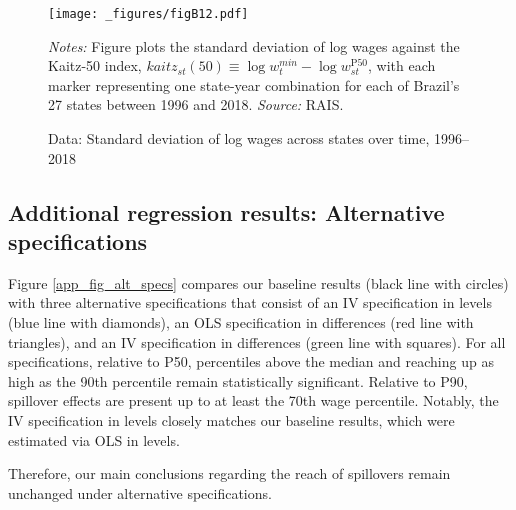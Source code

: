 \begin{figure}[!htb]
  \centering
  \caption{\label{fig:Lee_state_sd}Data: Standard deviation of log wages across states over time, 1996--2018}
  \prefigvspace
  \texttt{[image: \_figures/figB12.pdf]} %
  \\
  \postfigvspace
  \begin{minipage}[t]{1\columnwidth}%
    \begin{spacing}{0.75}
      \emph{\scriptsize{}Notes:}{\scriptsize{} Figure plots the standard deviation of log wages against the Kaitz-50 index, $kaitz_{st}(50)\equiv\log w_{t}^{min}-\log w_{st}^{\text{P}50}$,
      with each marker representing one state-year combination for each
      of Brazil's 27 states between 1996 and 2018. %
      \emph{\scriptsize{}Source: } RAIS.}
    \end{spacing}
  \end{minipage}
\end{figure}






\clearpage
\subsection{Additional regression results: Alternative specifications\label{app_subsec_alt_specs}}

Figure \ref{app_fig_alt_specs} compares our baseline results (black line with circles) with three alternative specifications that consist of an IV specification in levels (blue line with diamonds), an OLS specification in differences (red line with triangles), and an IV specification in differences (green line with squares). For all specifications, relative to P50, percentiles above the median and reaching up as high as the 90th percentile remain statistically significant. Relative to P90, spillover effects are present up to at least the 70th wage percentile. Notably, the IV specification in levels closely matches our baseline results, which were estimated via OLS in levels.

Therefore, our main conclusions regarding the reach of spillovers remain unchanged under alternative specifications.

